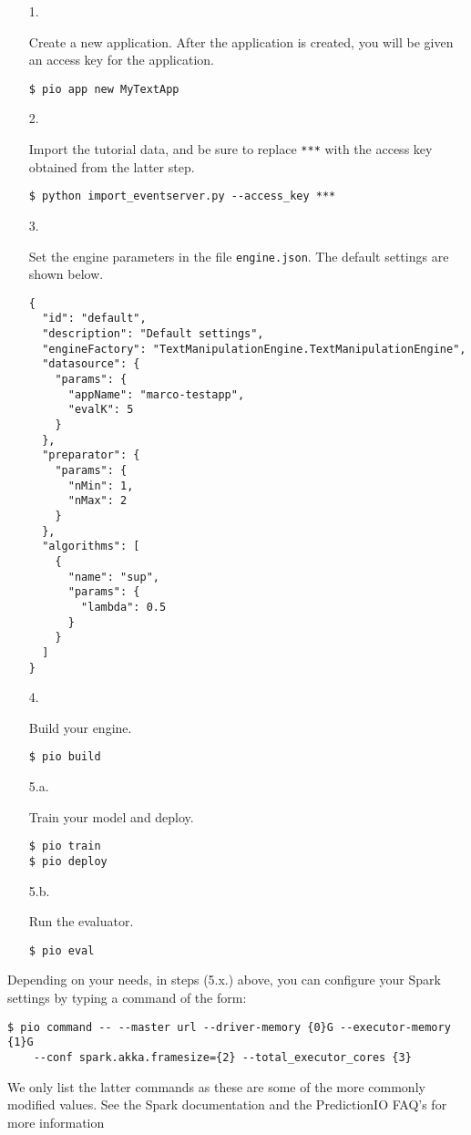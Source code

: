 \documentclass[a4paper,12pt]{article}
\renewcommand{\tt}[1]{\texttt{#1}}
\newcommand{\3}{\left}
\newcommand{\4}{\right}
\renewcommand{\-}[1]{{}^{-#1}}
\begin{document}
\begin{itemize}
\item[1.]{Create a new application. After the application is created, you will be given an access key for the application.
\begin{verbatim}
$ pio app new MyTextApp
\end{verbatim}}

\item[2.]{Import the tutorial data, and be sure to replace \tt{***} with the access key obtained from the latter step.
\begin{verbatim}
$ python import_eventserver.py --access_key ***
\end{verbatim}}

\item[3.]{Set the engine parameters in the file \tt{engine.json}. The default settings are shown below.

\break

\begin{verbatim}
{
  "id": "default",
  "description": "Default settings",
  "engineFactory": "TextManipulationEngine.TextManipulationEngine",
  "datasource": {
    "params": {
      "appName": "marco-testapp",
      "evalK": 5
    }
  },
  "preparator": {
    "params": {
      "nMin": 1,
      "nMax": 2
    }
  },
  "algorithms": [
    {
      "name": "sup",
      "params": {
        "lambda": 0.5
      }
    }
  ]
}
\end{verbatim}}

\item[4.]{Build your engine.
\begin{verbatim}
$ pio build
\end{verbatim}}

\item[5.a.]{Train your model and deploy.
\begin{verbatim}
$ pio train
$ pio deploy
\end{verbatim}}

\item[5.b.]{Run the evaluator.
\begin{verbatim}
$ pio eval
\end{verbatim}}
\end{itemize}

Depending on your needs, in steps (5.x.) above, you can configure your Spark settings by typing a command of the form:
\begin{verbatim}
$ pio command -- --master url --driver-memory {0}G --executor-memory {1}G 
	--conf spark.akka.framesize={2} --total_executor_cores {3}
\end{verbatim}
We only list the latter commands as these are some of the more commonly modified values. See the Spark documentation
and the PredictionIO FAQ's 
for more information
\end{document}

